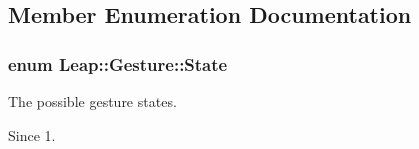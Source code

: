 \subsection{Member Enumeration Documentation}
\hypertarget{class_leap_1_1_gesture_a068c6f3ba05970dc557b62a366073578}{
\subsubsection[{State}]{\setlength{\rightskip}{0pt plus 5cm}enum {\bf Leap\+::\+Gesture\+::\+State}}}\label{class_leap_1_1_gesture_a068c6f3ba05970dc557b62a366073578}
The possible gesture states. \begin{DoxySince}{Since}
1. 
\end{DoxySince}

